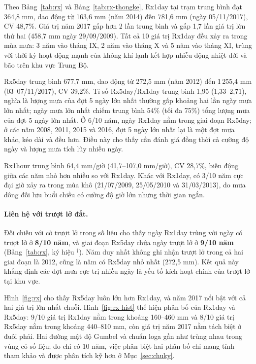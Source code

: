 Theo Bảng~\ref{tab:rx} và Bảng~\ref{tab:rx-thongke}, Rx1day tại trạm \TenTram{} trung bình đạt 364,8 mm, dao động từ 163,6 mm (năm 2014) đến 781,6 mm (ngày 05/11/2017), CV 48,7\%. Giá trị năm 2017 gấp hơn 2 lần trung bình và gấp 1,7 lần giá trị lớn thứ hai (458,7 mm ngày 29/09/2009). Tất cả 10 giá trị Rx1day đều xảy ra trong mùa mưa: 3 năm vào tháng IX, 2 năm vào tháng X và 5 năm vào tháng XI, trùng với thời kỳ hoạt động mạnh của không khí lạnh kết hợp nhiễu động nhiệt đới và bão trên khu vực Trung Bộ.

Rx5day trung bình 677,7 mm, dao động từ 272,5 mm (năm 2012) đến 1\,255,4 mm (03--07/11/2017), CV 39,2\%. Tỉ số Rx5day/Rx1day trung bình 1,95 (1,33--2,71), nghĩa là lượng mưa của đợt 5 ngày lớn nhất thường gấp khoảng hai lần ngày mưa lớn nhất; ngày mưa lớn nhất chiếm trung bình 54\% (tối đa 75\%) tổng lượng mưa của đợt 5 ngày lớn nhất. Ở 6/10 năm, ngày Rx1day nằm trong giai đoạn Rx5day; ở các năm 2008, 2011, 2015 và 2016, đợt 5 ngày lớn nhất lại là một đợt mưa khác, kéo dài và đều hơn. Điều này cho thấy cần đánh giá đồng thời cả cường độ ngày và lượng mưa tích lũy nhiều ngày.

Rx1hour trung bình 64,4 mm/giờ (41,7--107,0 mm/giờ), CV 28,7\%, biến động giữa các năm nhỏ hơn nhiều so với Rx1day. Khác với Rx1day, có 3/10 năm cực đại giờ xảy ra trong mùa khô (21/07/2009, 25/05/2010 và 31/03/2013), do mưa dông đối lưu buổi chiều có cường độ giờ lớn nhưng thời gian ngắn.

\paragraph{Liên hệ với trượt lở đất.} Đối chiếu với cờ trượt lở trong số liệu cho thấy ngày Rx1day trùng với ngày có trượt lở ở \textbf{8/10 năm}, và giai đoạn Rx5day chứa ngày trượt lở ở \textbf{9/10 năm} (Bảng~\ref{tab:rx}, ký hiệu $^{\dagger}$). Năm duy nhất không ghi nhận trượt lở trong cả hai giai đoạn là 2012, cũng là năm có Rx5day nhỏ nhất (272,5 mm). Kết quả này khẳng định các đợt mưa cực trị nhiều ngày là yếu tố kích hoạt chính của trượt lở tại khu vực.



Hình~\ref{fig:rx} cho thấy Rx5day luôn lớn hơn Rx1day, và năm 2017 nổi bật với cả hai giá trị lớn nhất chuỗi. Hình~\ref{fig:rx-hist} thể hiện phân bố của Rx1day và Rx5day: 9/10 giá trị Rx1day nằm trong khoảng 160--460 mm và 8/10 giá trị Rx5day nằm trong khoảng 440--810 mm, còn giá trị năm 2017 nằm tách biệt ở đuôi phải. Hai đường mật độ Gumbel và chuẩn loga gần như trùng nhau trong vùng có số liệu; do chỉ có 10 năm, việc phân biệt hai phân bố chỉ mang tính tham khảo và được phân tích kỹ hơn ở Mục~\ref{sec:chuky}.

